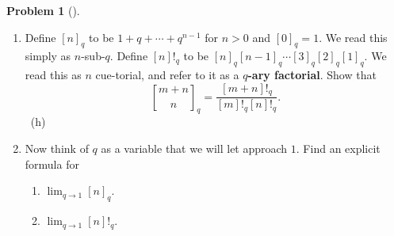 \documentclass[10pt,]{book}
\newcommand{\terminology}[1]{\textbf{#1}}
\theoremstyle{plain}
\theoremstyle{definition}
\newtheorem{activity}[project]{Problem}
\theoremstyle{definition}
\numberwithin{equation}{chapter}
\newcommand{\qchoose}[2]{\genfrac{[}{]}{0pt}{}{#1}{#2}_q}
\begin{document}
\begin{activity}[]
\begin{enumerate}[font=\bfseries,label=(\alph*),ref=\alph*]
\begin{enumerate}[font=\bfseries,label=(\roman*),ref=\theenumi.\roman*]
\item\label{task-151} \marginsymbol[-2.5em]{} \hypertarget{p-1199}{}%
The largest part of a partition counted by \(\qchoose{m+n}{n}\) is either \(m\) or is less than or equal to \(m-1\).  In the second case, the partition fits into a rectangle that is at most \(m-1\) units wide and at most \(n\) units deep.  What is the generating function for partitions of this type?  In the first case, what kind of rectangle does the partition we get by removing the largest part sit in?  What is the generating function for partitions that sit in this kind of rectangle?  What is the generating function for partitions that sit in this kind of rectangle after we remove a largest part of size \(m\)?  What recurrence relation does this give you?%
\item\label{task-152} \marginsymbol[-2.5em]{} \hypertarget{p-1203}{}%
What recurrence do you get from the other operation we studied in \hyperref[numberpartitionrecurrence]{Problem~\ref{numberpartitionrecurrence}}?%
\item\label{task-153} \marginsymbol[-2.5em]{} \hypertarget{p-1205}{}%
It is quite likely that the two recurrences you got are different.  One would expect that they might give different values for \(\qchoose{m+n}{n}\).  Can you resolve this potential conflict?%
~{\tiny (h)}\end{enumerate}
\item\label{task-154} \marginsymbol[-2.5em]{} \hypertarget{p-1208}{}%
Define \([n]_q\) to be \(1+q+\cdots+q^{n-1}\) for \(n>0\) and \([0]_q =1\).  We read this simply as \(n\)-sub-\(q\). Define \([n]!_q\) to be \([n]_q[n-1]_q\cdots [3]_q[2]_q[1]_q\). We read this as \(n\) cue-torial, and refer to it as a \terminology{\(q\)-ary factorial}. Show that%
\begin{equation*}
\qchoose{m+n}{n} = \frac{[m+n]!_q}{[m]!_q[n]!_q}.
\end{equation*}
%
~{\tiny (h)}\item\label{task-155} \marginsymbol[-2.5em]{} \hypertarget{p-1212}{}%
Now think of \(q\) as a variable that we will let approach \(1\). Find an explicit formula for \leavevmode%
\begin{enumerate}[label=(\roman*)]
\item\hypertarget{li-73}{}\(\displaystyle\lim_{q\rightarrow 1} [n]_q\).%
\item\hypertarget{li-74}{}\(\displaystyle\lim_{q\rightarrow 1} [n]!_q\).%

\end{enumerate}
\end{enumerate}
\end{activity}
\end{document}
